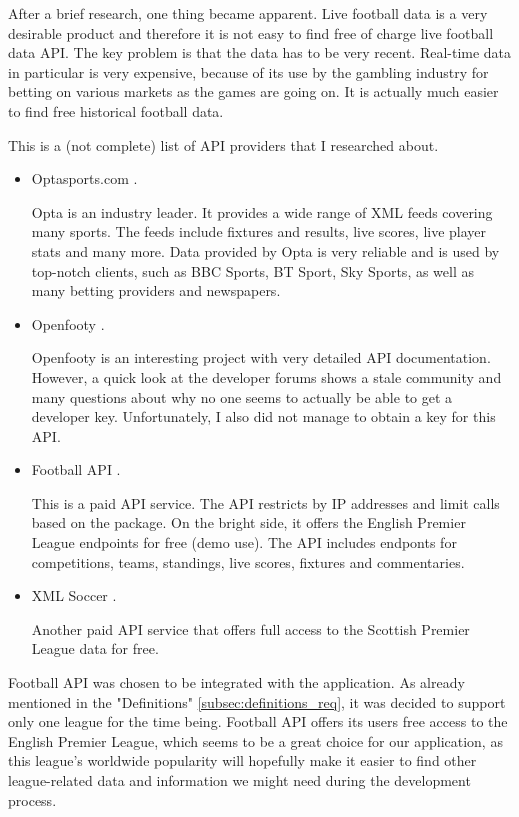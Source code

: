 After a brief research, one thing became apparent. Live football data is a very desirable product and therefore it is not easy to find free of charge live football data API. The key problem is that the data has to be very recent. Real-time data in particular is very expensive, because of its use by the gambling industry for betting on various markets as the games are going on. It is actually much easier to find free historical football data.  
	
This is a (not complete) list of API providers that I researched about.
	
\begin{itemize}
	\item Optasports.com \citep{source:opta}.\par
Opta is an industry leader. It provides a wide range of XML feeds covering many sports. The feeds include fixtures and results, live scores, live player stats and many more. Data provided by Opta is very reliable and is used by top-notch clients, such as BBC Sports, BT Sport, Sky Sports, as well as many betting providers and newspapers.		
	\item Openfooty \citep{source:openfooty}.\par 
	Openfooty is an interesting project with very detailed API documentation. However, a quick look at the developer forums shows a stale community and many questions about why no one seems to actually be able to get a developer key. Unfortunately, I also did not manage to obtain a key for this API.			
	\item Football API \citep{source:footballapi} .\par
This is a paid API service. The API restricts by IP addresses and limit calls based on the package. On the bright side, it offers the English Premier League endpoints for free (demo use). The API includes endponts for competitions, teams, standings, live scores, fixtures and commentaries.	
	\item XML Soccer \citep{source:xmlsoccer}. \par
	Another paid API service that offers full access to the Scottish Premier League data for free.
		
\end{itemize}
	
Football API was chosen to be integrated with the application. As already mentioned in the "Definitions" \ref{subsec:definitions_req}, it was decided to support only one league for the time being. Football API offers its users free access to the English Premier League, which seems to be a great choice for our application, as this league's worldwide popularity will hopefully make it easier to find other league-related data and information we might need during the development process.

